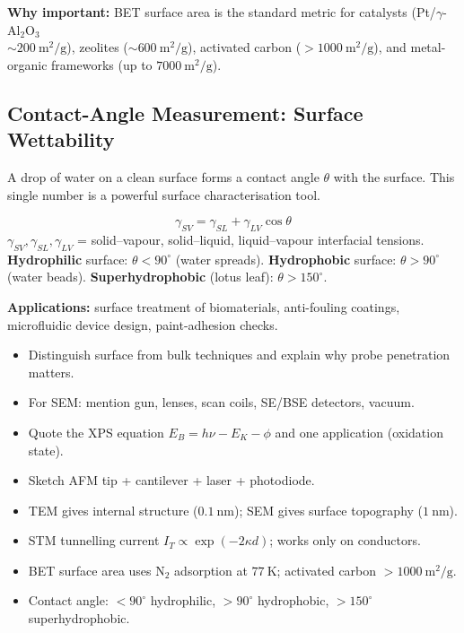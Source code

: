 \documentclass[12pt,a4paper]{article}
\begin{document}
\textbf{Why important:} BET surface area is the standard metric for catalysts (Pt/$\gamma$-$\mathrm{Al_2O_3}$ \\$\sim 200\ \mathrm{m^{2}/g}$), zeolites ($\sim 600\ \mathrm{m^{2}/g}$), activated carbon ($>1000\ \mathrm{m^{2}/g}$), and metal-organic frameworks (up to $7000\ \mathrm{m^{2}/g}$).

\subsection{Contact-Angle Measurement: Surface Wettability}
A drop of water on a clean surface forms a contact angle $\theta$ with the surface. This single number is a powerful surface characterisation tool.

\begin{tcolorbox}[formulabox, title={Young's Equation}]
\[
\gamma_{SV}=\gamma_{SL}+\gamma_{LV}\cos\theta
\]
$\gamma_{SV}, \gamma_{SL}, \gamma_{LV}$ = solid--vapour, solid--liquid, liquid--vapour interfacial tensions.\\
\textbf{Hydrophilic} surface: $\theta<90^\circ$ (water spreads). \textbf{Hydrophobic} surface: $\theta>90^\circ$ (water beads). \textbf{Superhydrophobic} (lotus leaf): $\theta>150^\circ$.
\end{tcolorbox}

\textbf{Applications:} surface treatment of biomaterials, anti-fouling coatings, microfluidic device design, paint-adhesion checks.

\begin{tcolorbox}[exambox, title={Exam Points (Section 6)}]
\begin{itemize}[leftmargin=*, itemsep=2pt, topsep=2pt]
  \item Distinguish surface from bulk techniques and explain why probe penetration matters.
  \item For SEM: mention gun, lenses, scan coils, SE/BSE detectors, vacuum.
  \item Quote the XPS equation $E_B=h\nu-E_K-\phi$ and one application (oxidation state).
  \item Sketch AFM tip + cantilever + laser + photodiode.
  \item TEM gives internal structure ($0.1\ \mathrm{nm}$); SEM gives surface topography ($1\ \mathrm{nm}$).
  \item STM tunnelling current $I_T \propto \exp(-2\kappa d)$; works only on conductors.
  \item BET surface area uses $\mathrm{N_2}$ adsorption at $77\ \mathrm{K}$; activated carbon $> 1000\ \mathrm{m^{2}/g}$.
  \item Contact angle: $<90^\circ$ hydrophilic, $>90^\circ$ hydrophobic, $>150^\circ$ superhydrophobic.
\end{itemize}
\end{tcolorbox}
\end{document}
